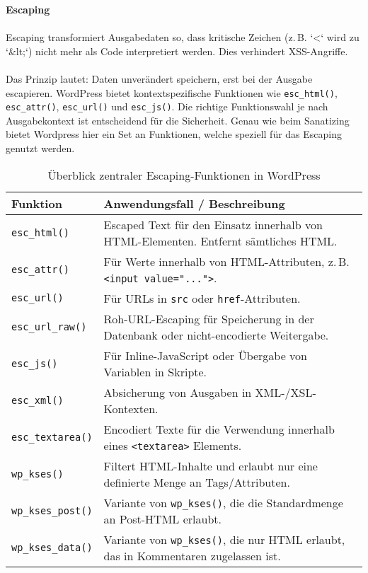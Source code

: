 \newpage

\textbf{Escaping}\\\\
Escaping transformiert Ausgabedaten so, dass kritische Zeichen (z.\,B. `<` wird zu `\&lt;`) nicht mehr als Code interpretiert werden. Dies verhindert XSS-Angriffe.\\\\
Das Prinzip lautet: Daten unverändert speichern, erst bei der Ausgabe escapieren. WordPress bietet kontextspezifische Funktionen wie \texttt{esc\_html()}, \texttt{esc\_attr()}, \texttt{esc\_url()} und \texttt{esc\_js()}.
Die richtige Funktionswahl je nach Ausgabekontext ist entscheidend für die Sicherheit.
Genau wie beim Sanatizing bietet Wordpress hier ein Set an Funktionen, welche speziell für das Escaping genutzt werden.

\begin{table}[h]
 \centering
 \begin{tabular}{|l|p{9cm}|}
  \hline
  \textbf{Funktion} & \textbf{Anwendungsfall / Beschreibung} \\
  \hline
  \texttt{esc\_html()} & Escaped Text für den Einsatz innerhalb von HTML-Elementen. Entfernt sämtliches HTML. \\
  \hline
  \texttt{esc\_attr()} & Für Werte innerhalb von HTML-Attributen, z.\,B. \texttt{<input value="...">}. \\
  \hline
  \texttt{esc\_url()} & Für URLs in \texttt{src} oder \texttt{href}-Attributen. \\
  \hline
  \texttt{esc\_url\_raw()} & Roh-URL-Escaping für Speicherung in der Datenbank oder nicht-encodierte Weitergabe. \\
  \hline
  \texttt{esc\_js()} & Für Inline-JavaScript oder Übergabe von Variablen in Skripte. \\
  \hline
  \texttt{esc\_xml()} & Absicherung von Ausgaben in XML-/XSL-Kontexten. \\
  \hline
  \texttt{esc\_textarea()} & Encodiert Texte für die Verwendung innerhalb eines \texttt{<textarea>} Elements. \\
  \hline
  \texttt{wp\_kses()} & Filtert HTML-Inhalte und erlaubt nur eine definierte Menge an Tags/Attributen. \\
  \hline
  \texttt{wp\_kses\_post()} & Variante von \texttt{wp\_kses()}, die die Standardmenge an Post-HTML erlaubt. \\
  \hline
  \texttt{wp\_kses\_data()} & Variante von \texttt{wp\_kses()}, die nur HTML erlaubt, das in Kommentaren zugelassen ist. \\
  \hline
 \end{tabular}
 \caption{Überblick zentraler Escaping-Funktionen in WordPress}
 \label{tab:escaping}
\end{table}


